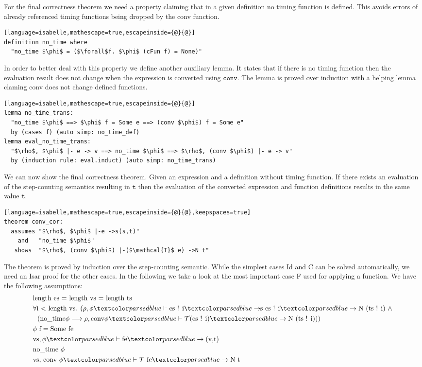 For the final correctness theorem we need a property claiming that in a given definition no timing function is defined.
This avoids errors of already referenced timing functions being dropped by the conv function.
\begin{lstlisting}[language=isabelle,mathescape=true,escapeinside={@}{@}]
definition no_time where
  "no_time $\phi$ = ($\forall$f. $\phi$ (cFun f) = None)"
\end{lstlisting}

In order to better deal with this property we define another auxiliary lemma.
It states that if there is no timing function then the evaluation result does not change when the expression is converted using $\texttt{conv}$.
The lemma is proved over induction with a helping lemma claming conv does not change defined functions.
\begin{lstlisting}[language=isabelle,mathescape=true,escapeinside={@}{@}]
lemma no_time_trans:
  "no_time $\phi$ ==> $\phi$ f = Some e ==> (conv $\phi$) f = Some e"
  by (cases f) (auto simp: no_time_def)
lemma eval_no_time_trans:
  "$\rho$, $\phi$ |- e -> v ==> no_time $\phi$ ==> $\rho$, (conv $\phi$) |- e -> v"
  by (induction rule: eval.induct) (auto simp: no_time_trans)
\end{lstlisting}

We can now show the final correctness theorem.
Given an expression and a definition without timing function.
If there exists an evaluation of the step-counting semantics resulting in $\texttt{t}$ then the evaluation of the converted expression and function definitions results in the same value $\texttt{t}$.
\begin{lstlisting}[language=isabelle,mathescape=true,escapeinside={@}{@},keepspaces=true]
theorem conv_cor:
  assumes "$\rho$, $\phi$ |-e ->s(s,t)"
    and   "no_time $\phi$"
   shows  "$\rho$, (conv $\phi$) |-($\mathcal{T}$ e) ->N t"
\end{lstlisting}

The theorem is proved by induction over the step-counting semantic.
While the simplest cases Id and C can be solved automatically, we need an Isar proof for the other cases.
In the following we take a look at the most important case F used for applying a function.
We have the following assumptions:
\begin{align}
  &\text{length es = length vs = length ts} \label{cor:len}\\
  &\forall\text{i < length vs. } (\rho, \phi \hvdash \text{es ! i} \hrightarrows \text{es ! i} \hrightarrow \text{N (ts ! i)}\ \land \label{cor:args}\\
  &\ \ (\text{no\_time} \phi \longrightarrow \rho, \text{conv} \phi \hvdash \mathcal{T} \text{(es ! i)} \hrightarrow \text{N (ts ! i)}))\nonumber\\
  &\phi\ \text{f} = \text{Some fe} \label{cor:phi}\\
  &\text{vs}, \phi \hvdash \text{fe} \hrightarrow \text{(v,t)} \label{cor:feeval}\\
  &\text{no\_time}\ \phi \label{cor:notime}\\
  &\text{vs, conv}\ \phi \hvdash \mathcal{T}\ \text{fe} \hrightarrow \text{N t} \label{cor:Tfeeval}
\end{align}

